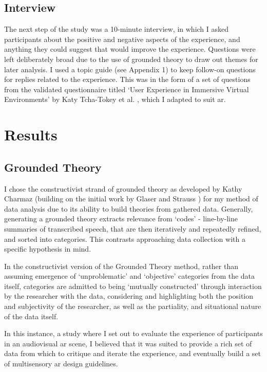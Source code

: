 \subsection{Interview}\label{sec: polaris-study-interview}
The next step of the study was a 10-minute interview, in which I asked participants about the positive and negative aspects of the experience, and anything they could suggest that would improve the experience. Questions were left deliberately broad due to the use of grounded theory to draw out themes for later analysis. I used a topic guide (see Appendix 1) to keep follow-on questions for replies related to the experience. This was in the form of a set of questions from the validated questionnaire titled `User Experience in Immersive Virtual Environments' by Katy Tcha-Tokey et al. \citeyearpar{tcha-tokey2016a}, which I adapted to suit \ac{ar}.

\section{Results}\label{sec: polaris-feedback}
\subsection{Grounded Theory}\label{sec: polaris-feedback-grounded}
I chose the constructivist strand of grounded theory as developed by Kathy Charmaz \citeyearpar{charmaz2006} (building on the initial work by Glaser and Strauss \citeyearpar{glaser1967}) for my method of data analysis due to its ability to build theories from gathered data. Generally, generating a grounded theory extracts relevance from `codes' - line-by-line summaries of transcribed speech, that are then iteratively and repeatedly refined, and sorted into categories. This contrasts approaching data collection with a specific hypothesis in mind.

In the constructivist version of the Grounded Theory method, rather than assuming emergence of `unproblematic' and `objective' categories from the data itself, categories are admitted to being `mutually constructed' through interaction by the researcher with the data, considering and highlighting both the position and subjectivity of the researcher, as well as the partiality, and situational nature of the data itself.

In this instance, a study where I set out to evaluate the experience of participants in an audiovisual \ac{ar} scene, I believed that it was suited to provide a rich set of data from which to critique and iterate the experience, and eventually build a set of multisensory \ac{ar} design guidelines.

